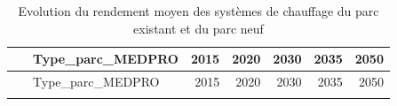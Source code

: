 \documentclass[]{article}
\begin{document}
\begin{longtable}[]{@{}clrrrrr@{}}
\caption{Evolution du rendement moyen des systèmes de chauffage du parc
existant et du parc neuf}\tabularnewline
\toprule
\begin{minipage}[b]{0.19\columnwidth}\centering\strut
~\strut
\end{minipage} & \begin{minipage}[b]{0.21\columnwidth}\raggedright\strut
Type\_parc\_MEDPRO\strut
\end{minipage} & \begin{minipage}[b]{0.08\columnwidth}\raggedleft\strut
2015\strut
\end{minipage} & \begin{minipage}[b]{0.08\columnwidth}\raggedleft\strut
2020\strut
\end{minipage} & \begin{minipage}[b]{0.08\columnwidth}\raggedleft\strut
2030\strut
\end{minipage} & \begin{minipage}[b]{0.08\columnwidth}\raggedleft\strut
2035\strut
\end{minipage} & \begin{minipage}[b]{0.08\columnwidth}\raggedleft\strut
2050\strut
\end{minipage}\tabularnewline
\midrule
\endfirsthead
\toprule
\begin{minipage}[b]{0.19\columnwidth}\centering\strut
~\strut
\end{minipage} & \begin{minipage}[b]{0.21\columnwidth}\raggedright\strut
Type\_parc\_MEDPRO\strut
\end{minipage} & \begin{minipage}[b]{0.08\columnwidth}\raggedleft\strut
2015\strut
\end{minipage} & \begin{minipage}[b]{0.08\columnwidth}\raggedleft\strut
2020\strut
\end{minipage} & \begin{minipage}[b]{0.08\columnwidth}\raggedleft\strut
2030\strut
\end{minipage} & \begin{minipage}[b]{0.08\columnwidth}\raggedleft\strut
2035\strut
\end{minipage} & \begin{minipage}[b]{0.08\columnwidth}\raggedleft\strut
2050\strut
\end{minipage}\tabularnewline
\midrule
\endhead
\begin{minipage}[t]{0.19\columnwidth}\centering\strut

\end{minipage}
\end{longtable}
\end{document}
